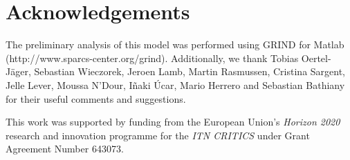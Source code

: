 \section{Acknowledgements}
\label{sec:Acknowledgements}
The preliminary analysis of this model was performed using GRIND for Matlab (http://www.sparcs-center.org/grind). Additionally, we thank Tobias Oertel-Jäger, Sebastian Wieczorek, Jeroen Lamb, Martin Rasmussen, Cristina Sargent, Jelle Lever, Moussa N'Dour, Iñaki Úcar, Mario Herrero and Sebastian Bathiany for their useful comments and suggestions. 

This work was supported by funding from the European Union's \textit{Horizon 2020} research and innovation programme for the \textit{ITN CRITICS} under Grant Agreement Number 643073.